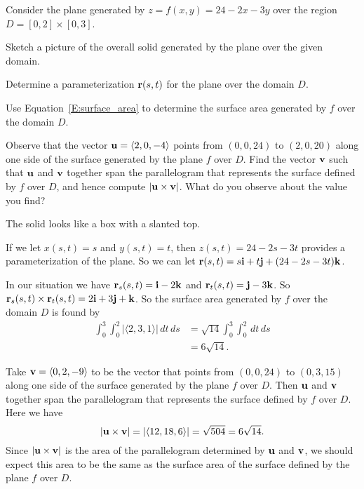 \begin{exercises}
\item Consider the plane generated by $z = f(x,y) = 24 - 2x - 3y$ over the region $D = [0,2]\times[0,3]$.
	
\ba
	\item Sketch a picture of the overall solid generated by the plane over the given domain.
	\item Determine a parameterization $\mathbf{r}(s,t)$ for the plane over the domain $D$.
	\item Use Equation~\ref{E:surface_area} to determine the surface area generated by $f$ over the domain $D$.
	\item Observe that the vector $\mathbf{u} = \langle 2, 0, -4 \rangle$ points from $(0,0,24)$ to $(2,0,20)$ along one side of the surface generated by the plane $f$ over $D$.  Find the vector $\mathbf{v}$ such that $\mathbf{u}$ and $\mathbf{v}$ together span the parallelogram that represents the surface defined by $f$ over $D$, and hence compute $| \mathbf{u} \times \mathbf{v} |$.  What do you observe about the value you find?
\ea

\begin{exerciseSolution}
\ba
	\item The solid looks like a box with a slanted top. 
	\item If we let $x(s,t) = s$ and $y(s,t) = t$, then $z(s,t) = 24-2s-3t$ provides a parameterization of the plane. So we can let $\mathbf{r}(s,t) = s \mathbf{i} + t \mathbf{j} + (24-2s-3t) \mathbf{k}$. 
	\item In our situation we have $\mathbf{r}_s(s,t) = \mathbf{i} - 2 \mathbf{k}$ and $\mathbf{r}_t(s,t) = \mathbf{j} - 3 \mathbf{k}$. So $\mathbf{r}_s(s,t) \times \mathbf{r}_t(s,t) = 2 \mathbf{i} + 3\mathbf{j} + \mathbf{k}$. So  the surface area generated by $f$ over the domain $D$ is found by 
\begin{align*}
 \int_0^{3} \int_0^{2} | \langle 2,3,1 \rangle | \, dt \, ds &=  \sqrt{14} \int_0^{3} \int_0^{2} \, dt \, ds \\
    &= 6 \sqrt{14}.
\end{align*}
	\item Take $\mathbf{v} = \langle 0, 2, -9 \rangle$ to be the vector that points from $(0,0,24)$ to $(0,3,15)$ along one side of the surface generated by the plane $f$ over $D$. Then $\mathbf{u}$ and $\mathbf{v}$ together span the parallelogram that represents the surface defined by $f$ over $D$. Here we have 
\[| \mathbf{u} \times \mathbf{v} | = | \langle 12, 18, 6 \rangle | = \sqrt{504} = 6 \sqrt{14}.\]
Since $| \mathbf{u} \times \mathbf{v} |$ is the area of the parallelogram determined by $\mathbf{u}$ and $\mathbf{v}$, we should expect this area to be the same as the surface area of the surface defined by the plane $f$ over $D$. 
\ea
\end{exerciseSolution}


\end{exercises}
